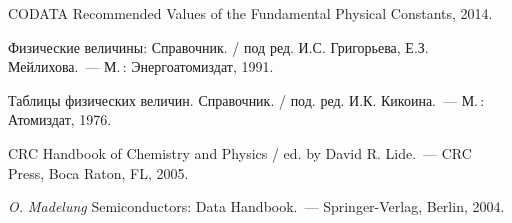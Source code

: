 \begin{labsupplement}

\clearpage

\begin{lab:literature}
 \item \label{bib:codata} CODATA Recommended Values of the Fundamental Physical Constants, 2014.
 \item \label{bib:grig} Физические величины: Справочник. /
    под ред. И.С. Григорьева, Е.З. Мейлихова.~--- М.\,: Энергоатомиздат, 1991.
 \item \label{bib:kikoin} Таблицы физических величин. Справочник. /
    под. ред. И.К. Кикоина.~--- М.\,: Атомиздат, 1976.
 \item \label{bib:handbook} CRC Handbook of Chemistry and Physics / ed. by David R. Lide.~---
 CRC Press, Boca Raton, FL, 2005.
 \item \label{bib:semi} \textit{O. Madelung} Semiconductors: Data Handbook.~---
 Springer-Verlag, Berlin, 2004.

\end{lab:literature}

\end{labsupplement}
